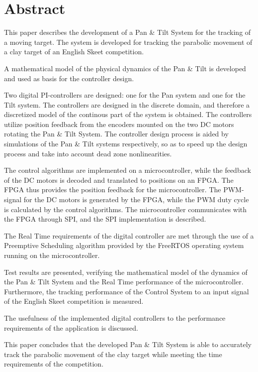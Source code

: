 
\setcounter{page}{1}
\section*{Abstract}
This paper describes the development of a Pan \& Tilt System for the tracking of a moving
target. The system is developed for tracking the parabolic movement of
a clay target of an English Skeet competition.

A mathematical model of the physical dynamics of the Pan \& Tilt is
developed and used as basis for the controller design.

Two digital PI-controllers are designed: one for the Pan system and one for the Tilt system.
The controllers are designed in the discrete domain, and therefore a discretized model
of the continous part of the system is obtained.
The controllers utilize position feedback from the encoders mounted on the two DC motors
rotating the Pan \& Tilt System.
The controller design process is aided by simulations of the Pan \& Tilt systems respectively,
so as to speed up the design process and take into account dead zone nonlinearities.

The control algorithms are implemented on a microcontroller, while
the feedback of the DC motors is decoded and translated to positions on an FPGA.
The FPGA thus provides the position feedback for the microcontroller.
The PWM-signal for the DC motors is generated by the FPGA, while the PWM duty cycle is calculated by the control algorithms.
The microcontroller communicates with the FPGA through SPI, and the SPI implementation is described.

The Real Time requirements of the digital controller are met through the use
of a Preemptive Scheduling algorithm provided by the FreeRTOS operating
system running on the microcontroller.

Test results are presented,
verifying the mathematical model of the dynamics of the Pan \& Tilt System
and the Real Time performance of the microcontroller.
Furthermore, the tracking performance of the Control System to an input signal
of the English Skeet competition is measured.

The usefulness of the implemented digital controllers to the performance requirements
of the application is discussed.

This paper concludes that the developed Pan \& Tilt System
is able to accurately track the parabolic movement of the clay target while
meeting the time requirements of the competition.

